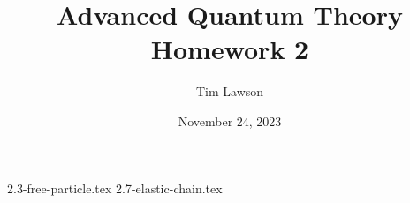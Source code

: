 \documentclass[a4paper]{extarticle}
\title{Advanced Quantum Theory\\
\large Homework 2}
\author{Tim Lawson}
\date{November 24, 2023}
\numberwithin{equation}{subsection}
\begin{document}
\maketitle

\setcounter{section}{2}
\setcounter{subsection}{2}
{2.3-free-particle.tex}
\setcounter{subsection}{6}
{2.7-elastic-chain.tex}
\end{document}
